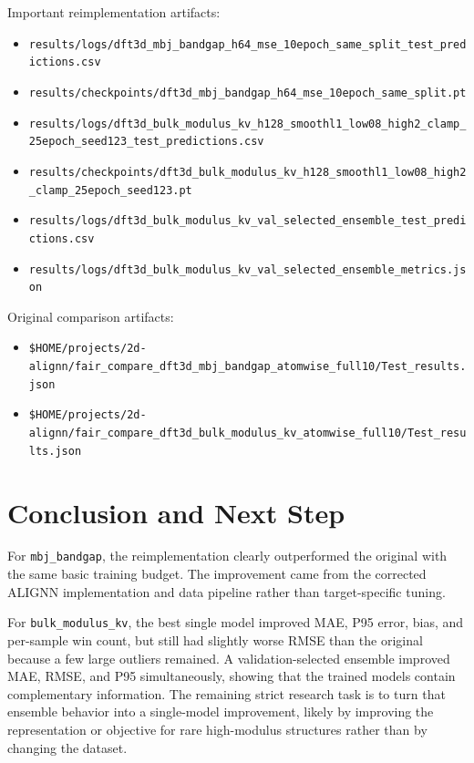 \documentclass[11pt]{article}
\begin{document}
Important reimplementation artifacts:
\begin{itemize}
  \item \texttt{results/logs/dft3d\_mbj\_bandgap\_h64\_mse\_10epoch\_same\_split\_test\_predictions.csv}
  \item \texttt{results/checkpoints/dft3d\_mbj\_bandgap\_h64\_mse\_10epoch\_same\_split.pt}
  \item \texttt{results/logs/dft3d\_bulk\_modulus\_kv\_h128\_smoothl1\_low08\_high2\_clamp\_25epoch\_seed123\_test\_predictions.csv}
  \item \texttt{results/checkpoints/dft3d\_bulk\_modulus\_kv\_h128\_smoothl1\_low08\_high2\_clamp\_25epoch\_seed123.pt}
  \item \texttt{results/logs/dft3d\_bulk\_modulus\_kv\_val\_selected\_ensemble\_test\_predictions.csv}
  \item \texttt{results/logs/dft3d\_bulk\_modulus\_kv\_val\_selected\_ensemble\_metrics.json}
\end{itemize}

Original comparison artifacts:
\begin{itemize}
  \item \texttt{\$HOME/projects/2d-alignn/fair\_compare\_dft3d\_mbj\_bandgap\_atomwise\_full10/Test\_results.json}
  \item \texttt{\$HOME/projects/2d-alignn/fair\_compare\_dft3d\_bulk\_modulus\_kv\_atomwise\_full10/Test\_results.json}
\end{itemize}

\section{Conclusion and Next Step}

For \texttt{mbj\_bandgap}, the reimplementation clearly outperformed the original with the same basic training budget.  The improvement came from the corrected ALIGNN implementation and data pipeline rather than target-specific tuning.

For \texttt{bulk\_modulus\_kv}, the best single model improved MAE, P95 error, bias, and per-sample win count, but still had slightly worse RMSE than the original because a few large outliers remained.  A validation-selected ensemble improved MAE, RMSE, and P95 simultaneously, showing that the trained models contain complementary information.  The remaining strict research task is to turn that ensemble behavior into a single-model improvement, likely by improving the representation or objective for rare high-modulus structures rather than by changing the dataset.
\end{document}
